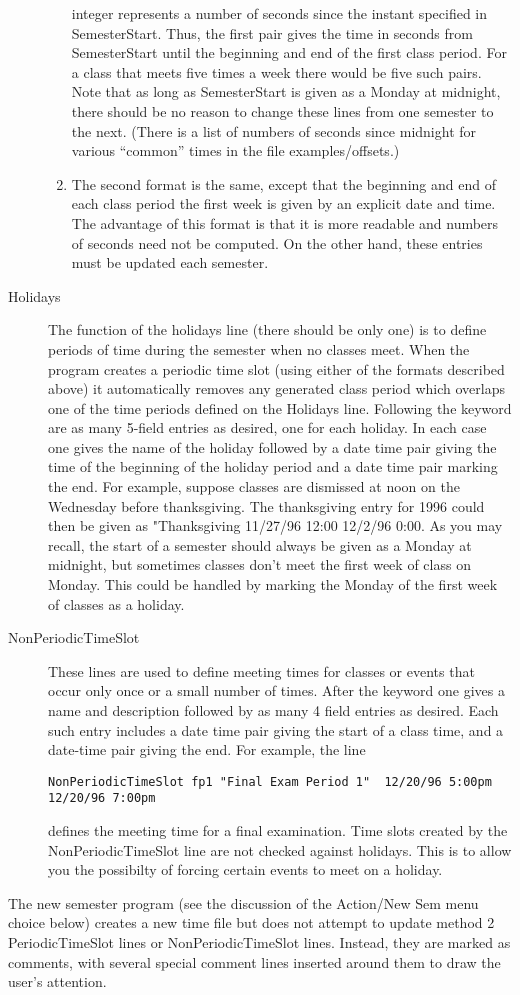 \begin{description}
\begin{enumerate}
integer represents a number of seconds since the instant specified in
SemesterStart. Thus, the first pair gives the time in seconds from 
SemesterStart until the beginning and end of the first class period. For 
a class that meets five times a week there would be five such pairs. Note
that as long as SemesterStart is given as a Monday at midnight, there should
be no reason to change these lines from one semester to the next. (There is
a list of numbers of seconds since midnight for various ``common'' times in
the file examples/offsets.)
\item The second format is the same, except that the beginning and end of
each class period the first week is given by an explicit date and time. The
advantage of this format is that it is more readable and numbers of seconds
need not be computed. On the other hand, these entries must be updated 
each semester.
\end{enumerate}
\item [Holidays] The function of the holidays line (there should be only one) is to define periods of time during the semester when no classes meet. When
the program creates a periodic time slot (using either of the formats described
above) it  automatically removes any generated class period which overlaps  one of the time periods defined on the Holidays line. Following the
keyword are as many 5-field entries as desired, one for each holiday. In
each case one gives the name of the holiday followed by a date time pair 
giving the time of the beginning of the holiday period and a date time pair
marking the end. For example, suppose classes are dismissed at noon on
the Wednesday before thanksgiving. The thanksgiving entry for 1996 could
then be given as "Thanksgiving 11/27/96 12:00 12/2/96 0:00. As you may recall,
the start of a semester should always be given as a Monday at midnight, but
sometimes classes don't meet the first week of class on Monday. This could
be handled by marking the Monday of the first week of classes as a holiday. 
\item [NonPeriodicTimeSlot] These lines are used to define meeting times
for classes or events that occur only once or a small number of times. After
the keyword one gives a name and description followed by as many 4 field entries as desired. Each such entry
includes a date time pair giving the start of a class time, and a date-time
pair giving the end. For example, the line 
\smallskip
\begin{verbatim}
NonPeriodicTimeSlot fp1 "Final Exam Period 1"  12/20/96 5:00pm 12/20/96 7:00pm
\end{verbatim}
\smallskip
defines the meeting time for a final examination. Time slots created by the
NonPeriodicTimeSlot line are not checked against holidays. This is to allow
you the possibilty of forcing certain events to meet on a holiday.
\end{description}
The new semester program (see the discussion of the Action/New Sem menu choice
below) creates a new time file but does not attempt to update method 2
PeriodicTimeSlot lines or NonPeriodicTimeSlot lines. Instead, they are marked
as comments, with several special comment lines inserted around them to
draw the user's attention.

